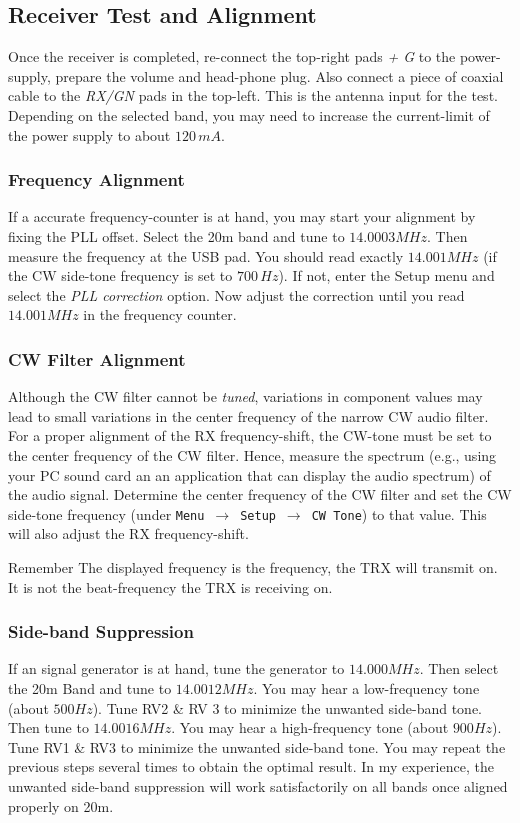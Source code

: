 \documentclass[10pt, a4paper,twoside,openright]{scrartcl}
\newenvironment{remember}{\begin{bclogo}[couleur=blue!30,arrondi=.1,logo=\bccrayon,ombre=true]{Remember}}{\end{bclogo}}
\begin{document}
\subsection{Receiver Test and Alignment}
Once the receiver is completed, re-connect the top-right pads \emph{+ G} to the power-supply, prepare the volume and head-phone plug. Also connect a piece of coaxial cable to the \emph{RX/GN} pads in the top-left. This is the antenna input for the test. Depending on the selected band, you may need to increase the current-limit of the power supply to about $120\,mA$. 

\subsubsection{Frequency Alignment}
If a accurate frequency-counter is at hand, you may start your alignment by fixing the PLL offset. Select the 20m band and tune to $14.0003 MHz$. Then measure the frequency at the USB pad. You should read exactly $14.001 MHz$ (if the CW side-tone frequency is set to $700\,Hz$). If not, enter the Setup menu and select the \emph{PLL correction} option. Now adjust the correction until you read $14.001 MHz$ in the frequency counter.

\subsubsection{CW Filter Alignment}
Although the CW filter cannot be \emph{tuned}, variations in component values may lead to small variations in the center frequency of the narrow CW audio filter. For a proper alignment of the RX frequency-shift, the CW-tone must be set to the center frequency of the CW filter. Hence, measure the spectrum (e.g., using your PC sound card an an application that can display the audio spectrum) of the audio signal. Determine the center frequency of the CW filter and set the CW side-tone frequency (under \texttt{Menu}\ $\rightarrow$\ \texttt{Setup}\ $\rightarrow$\ \texttt{CW Tone}) to that value. This will also adjust the RX frequency-shift.

\begin{remember}
The displayed frequency is the frequency, the TRX will transmit on. It is not the beat-frequency the TRX is receiving on.
\end{remember}

\subsubsection{Side-band Suppression}
If an signal generator is at hand, tune the generator to $14.000 MHz$. Then select the 20m Band and tune to $14.0012 MHz$. You may hear a low-frequency tone (about $500Hz$). Tune RV2 \& RV 3 to minimize the unwanted side-band tone. Then tune to $14.0016 MHz$. You may hear a high-frequency tone (about $900 Hz$). Tune RV1 \& RV3 to minimize the unwanted side-band tone. You may repeat the previous steps several times to obtain the optimal result. In my experience, the unwanted side-band suppression will work satisfactorily on all bands once aligned properly on 20m. 
\end{document}
